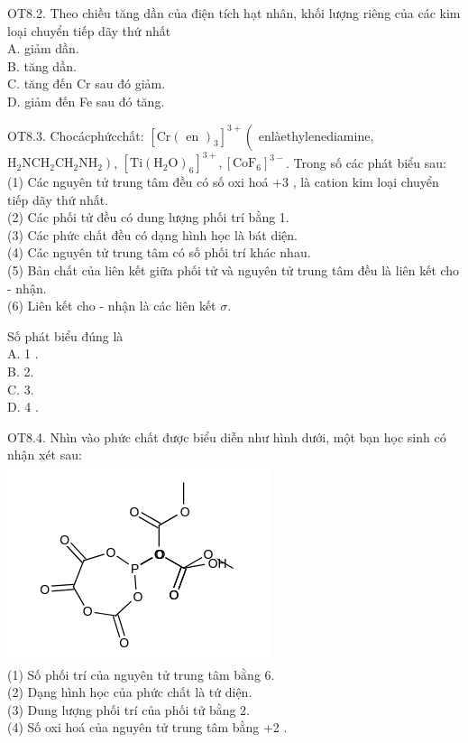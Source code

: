\documentclass[10pt]{article}
\begin{document}
OT8.2. Theo chiều tăng dần của điện tích hạt nhân, khối lượng riêng của các kim loại chuyển tiếp dãy thứ nhất\\
A. giảm dần.\\
B. tăng dần.\\
C. tăng đến Cr sau đó giảm.\\
D. giảm đến Fe sau đó tăng.

OT8.3. Chocácphứcchất: $\left[\mathrm{Cr}(\text { en })_{3}\right]^{3+}\left(\right.$ enlàethylenediamine, $\left.\mathrm{H}_{2} \mathrm{NCH}_{2} \mathrm{CH}_{2} \mathrm{NH}_{2}\right)$, $\left[\mathrm{Ti}\left(\mathrm{H}_{2} \mathrm{O}\right)_{6}\right]^{3+},\left[\mathrm{CoF}_{6}\right]^{3-}$. Trong số các phát biểu sau:\\
(1) Các nguyên tử trung tâm đều có số oxi hoá +3 , là cation kim loại chuyển tiếp dãy thứ nhất.\\
(2) Các phối tử đều có dung lượng phối trí bằng 1.\\
(3) Các phức chất đều có dạng hình học là bát diện.\\
(4) Các nguyên tử trung tâm có số phối trí khác nhau.\\
(5) Bản chất của liên kết giữa phối tử và nguyên tử trung tâm đều là liên kết cho - nhận.\\
(6) Liên kết cho - nhận là các liên kết $\sigma$.

Số phát biểu đúng là\\
A. 1 .\\
B. 2.\\
C. 3.\\
D. 4 .

OT8.4. Nhìn vào phức chất được biểu diễn như hình dưới, một bạn học sinh có nhận xét sau:\\
\includegraphics{smile-a785d245a8cad96d80f8eb88fe80d2067dd4ba2a}\\
(1) Số phối trí của nguyên tử trung tâm bằng 6.\\
(2) Dạng hình học của phức chất là tứ diện.\\
(3) Dung lượng phối trí của phối tử bằng 2.\\
(4) Số oxi hoá của nguyên tử trung tâm bằng +2 .
\end{document}
